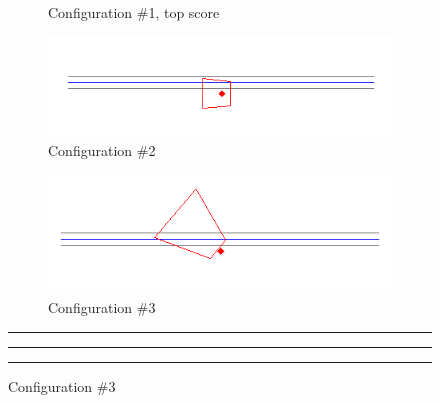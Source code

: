 \documentclass[a4paper,12pt,twoside,openright]{report}
\begin{document}
\begin{figure}[h!]
\begin{subfigure}[b]{0.45\textwidth}
    \caption{Configuration \#1, top score}
\end{subfigure}
\begin{subfigure}[b]{0.49\textwidth}
    \centering
    \includegraphics[width=\textwidth]{figures/simple_objective/0_curvature_pos2_small.png}
    \caption{Configuration \#2}
\end{subfigure}
\begin{subfigure}[b]{0.49\textwidth}
    \centering
    \includegraphics[width=\textwidth]{figures/simple_objective/0_curvature_pos3_small.png}
    \caption{Configuration \#3}
\end{subfigure}
\hrule
\hrule
\hrule


\end{figure}
\end{document}
